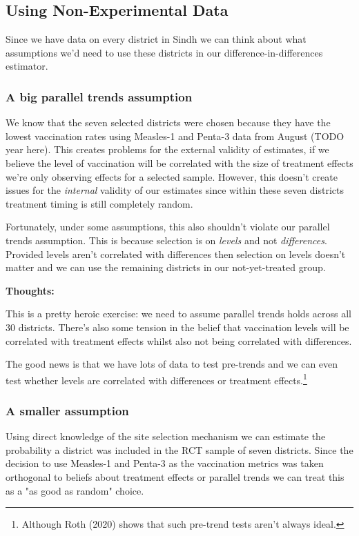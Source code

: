 \documentclass{article}
\begin{document}
   \subsection*{Using Non-Experimental Data}

   Since we have data on every district in Sindh we can think about what assumptions 
   we'd need to use these districts in our difference-in-differences estimator.

   \subsubsection*{A big parallel trends assumption}
   We know that the seven selected districts were chosen because they have the 
   lowest vaccination rates using Measles-1 and Penta-3 data from August (TODO year here). This 
   creates problems for the external validity of estimates, if we believe 
   the level of vaccination will be correlated with the size of treatment effects 
   we're only observing effects for a selected sample. However, this doesn't create 
   issues for the \textit{internal} validity of our estimates since within these 
   seven districts treatment timing is still completely random.

   Fortunately, under some assumptions, this also shouldn't violate  our 
   parallel trends assumption. This 
   is because selection is on \textit{levels} and not \textit{differences}.  
   Provided levels aren't correlated with differences then selection on levels 
   doesn't matter and we can use the remaining districts in our not-yet-treated 
   group.

   \textbf{Thoughts:}

   This is a pretty heroic exercise: we need to assume parallel trends holds across 
   all 30 districts. There's also some tension in the belief that vaccination 
   levels will be correlated with treatment effects whilst also not being correlated 
   with differences.


   The good news is that we have lots of data to test pre-trends and we can even 
   test whether levels are correlated with differences or treatment effects.\footnote{Although 
   Roth (2020) shows that such pre-trend tests aren't always ideal.}

   \subsubsection*{A smaller assumption}

   Using direct knowledge of the site selection mechanism we can estimate the 
   probability a district was included in the RCT sample of seven districts. Since the 
   decision to use Measles-1 and Penta-3 as the vaccination metrics was taken 
   orthogonal to beliefs about treatment effects or parallel trends we can 
   treat this as a "as good as random" choice.  
\end{document}
